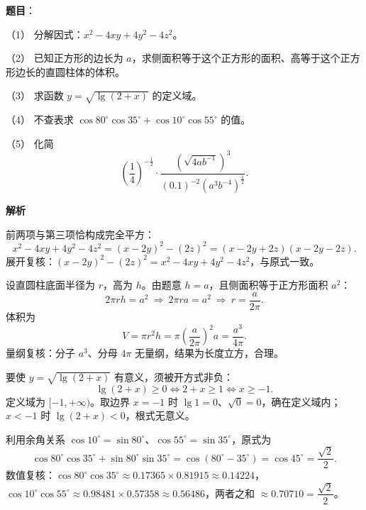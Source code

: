 \begin{answer}

\textbf{题目}：

（1） 分解因式：$x^2-4xy+4y^2-4z^2$。

（2） 已知正方形的边长为 $a$，求侧面积等于这个正方形的面积、高等于这个正方形边长的直圆柱体的体积。

（3） 求函数 $y=\sqrt{\lg(2+x)}$ 的定义域。

（4） 不查表求 $\cos 80^\circ\cos 35^\circ+\cos 10^\circ\cos 55^\circ$ 的值。

（5） 化简
\nopagebreak[4]
\[
\left(\frac14\right)^{-\frac12}\cdot\frac{\left(\sqrt{4ab^{-1}}\right)^3}{(0.1)^{-2}\left(a^3b^{-4}\right)^{\frac12}}.
\]

\textbf{解析}


前两项与第三项恰构成完全平方：
\nopagebreak[4]
\[
x^2-4xy+4y^2-4z^2=(x-2y)^2-(2z)^2=(x-2y+2z)(x-2y-2z).
\]
展开复核：$(x-2y)^2-(2z)^2=x^2-4xy+4y^2-4z^2$，与原式一致。


设直圆柱底面半径为 $r$，高为 $h$。由题意 $h=a$，且侧面积等于正方形面积 $a^2$：
\nopagebreak[4]
\[
2\pi rh=a^2\ \Rightarrow\ 2\pi ra=a^2\ \Rightarrow\ r=\frac{a}{2\pi}.
\]
体积为
\nopagebreak[4]
\[
V=\pi r^2h=\pi\left(\frac{a}{2\pi}\right)^2a=\frac{a^3}{4\pi}.
\]
量纲复核：分子 $a^3$、分母 $4\pi$ 无量纲，结果为长度立方，合理。


要使 $y=\sqrt{\lg(2+x)}$ 有意义，须被开方式非负：
\nopagebreak[4]
\[
\lg(2+x)\ge0\iff 2+x\ge1\iff x\ge-1.
\]
定义域为 $[-1,+\infty)$。取边界 $x=-1$ 时 $\lg1=0$、$\sqrt0=0$，确在定义域内；$x<-1$ 时 $\lg(2+x)<0$，根式无意义。


利用余角关系 $\cos10^\circ=\sin80^\circ$、$\cos55^\circ=\sin35^\circ$，原式为
\nopagebreak[4]
\[
\cos80^\circ\cos35^\circ+\sin80^\circ\sin35^\circ=\cos(80^\circ-35^\circ)=\cos45^\circ=\frac{\sqrt2}{2}.
\]
数值复核：$\cos80^\circ\cos35^\circ\approx0.17365\times0.81915\approx0.14224$，$\cos10^\circ\cos55^\circ\approx0.98481\times0.57358\approx0.56486$，两者之和 $\approx0.70710=\dfrac{\sqrt2}{2}$。



\end{answer}

